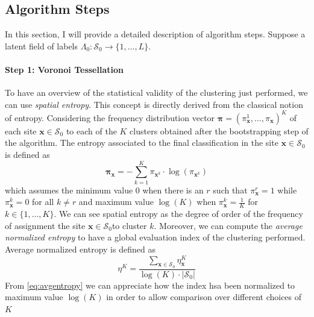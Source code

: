 \subsection{Algorithm Steps}
\label{subsec:algsteps}
In this section, I will provide a detailed description of algorithm steps.
Suppose a latent field of labels $\Lambda_0:\mathcal{S}_0 \rightarrow \{1,\dots,L\}$.

\paragraph{Step 1: Voronoi Tessellation}






To have an overview of the statistical validity of the clustering just performed, we can use \textit{spatial entropy}. This concept is directly derived from the classical notion of entropy. Considering the frequency distribution vector $\boldsymbol{\pi}=(\pi_{\mathbf{x}}^1,\dots,\pi_{\mathbf{x}})^K$ of each site $\mathbf{x} \in \mathcal{S}_0$ to each of the $K$ clusters obtained after the bootstrapping step of the algorithm. The entropy associated to the final classification in the site $\mathbf{x}\in\mathcal{S}_0$ is defined as
\begin{equation}
\mathbf{\pi}_{\mathbf{x}}=-\sum_{k=1}^K\pi_{\mathbf{x}^k}\cdot \log(\pi_{\mathbf{x}^k})
\end{equation}
which assumes the minimum value 0 when there is an $r$ such that $\pi_{\mathbf{x}}^r=1$ while $\pi_{\mathbf{x}}^k=0$ for all $k\neq r$ and maximum value $\log(K)$ when $\pi_{\mathbf{x}}^k=\frac{1}{K}$ for $k\in\{1,\dots,K\}$. We can see spatial entropy as the degree of order of the frequency of assignment the site $\mathbf{x}\in\mathcal{S}_0$to cluster $k$. Moreover, we can compute the \textit{average normalized entropy} to have a global evaluation index of the clustering performed. Average normalized entropy is defined as
\begin{equation}
\label{eq:avgentropy}
    \eta^K=\frac{\sum_{\textbf{x}\in\mathcal{S}_0}\eta_{\mathbf{x}}^K}{\log(K)\cdot |\mathcal{S}_0|}
\end{equation}
From \ref{eq:avgentropy} we can appreciate how the index hsa been normalized to maximum value $\log(K)$ in order to allow comparison over different choices of $K$


